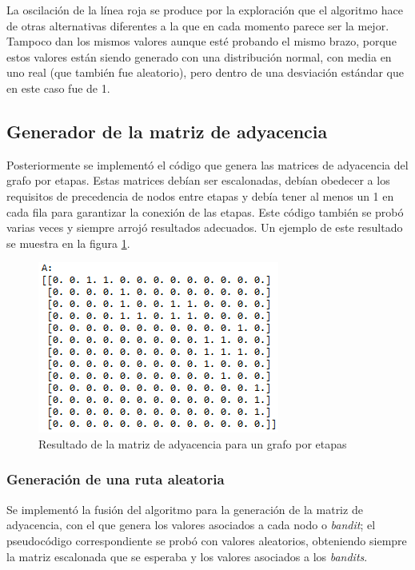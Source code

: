 La oscilación de la línea roja se produce por la exploración que el algoritmo hace de otras alternativas diferentes a la que en cada momento parece ser la mejor. Tampoco dan los mismos valores aunque esté probando el mismo brazo, porque estos valores están siendo generado con una distribución normal, con media en uno real (que también fue aleatorio), pero dentro de una desviación estándar que en este caso fue de 1. 

\subsection{Generador de la matriz de adyacencia}

Posteriormente se implementó el código que genera las matrices de adyacencia del grafo por etapas. Estas matrices debían ser escalonadas, debían obedecer a los requisitos de precedencia de nodos entre etapas y debía tener al menos un 1 en cada fila para garantizar la conexión de las etapas. Este código también se probó varias veces y siempre arrojó resultados adecuados. Un ejemplo de este resultado se muestra en la figura \ref{MatrizAy}.

\begin{figure} [H]
    \label{Resul2}
	\centering
	\includegraphics[scale=0.8]{MatrizAy}
	\caption{Resultado de la matriz de adyacencia para un grafo por etapas}
	\label{MatrizAy}
\end{figure}

\subsubsection{Generación de una ruta aleatoria}

Se implementó la fusión del algoritmo para la generación de la matriz de adyacencia, con el que genera los valores asociados a cada nodo o \textit{bandit}; el pseudocódigo correspondiente se probó con valores aleatorios, obteniendo siempre la matriz escalonada que se esperaba y los valores asociados a los \textit{bandits}.

